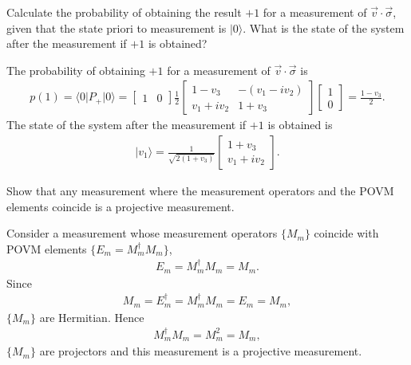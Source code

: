 \documentclass[en]{sol-man}
\begin{document}
\begin{exe}
    Calculate the probability of obtaining the result $+1$ for a measurement of $\vec{v}\cdot\vec{\sigma}$, given that the state priori to measurement is $\lvert 0\rangle$. What is the state of the system after the measurement if $+1$ is obtained?
\end{exe}
\begin{sol}
    The probability of obtaining $+1$ for a measurement of $\vec{v}\cdot\vec{\sigma}$ is
    \begin{align}
        p(1)=\langle 0\rvert P_+\lvert 0\rangle=\left[\begin{matrix}
            1&0
        \end{matrix}\right]\frac{1}{2}\left[\begin{matrix}
            1-v_3&-(v_1-iv_2)\\
            v_1+iv_2&1+v_3
        \end{matrix}\right]\left[\begin{matrix}
            1\\
            0
        \end{matrix}\right]=\frac{1-v_3}{2}.
    \end{align}
    The state of the system after the measurement if $+1$ is obtained is
    \begin{align}
        \lvert v_1\rangle=\frac{1}{\sqrt{2(1+v_3)}}\left[\begin{matrix}
            1+v_3\\
            v_1+iv_2
        \end{matrix}\right].
    \end{align}
\end{sol}

\begin{exe}
    Show that any measurement where the measurement operators and the POVM elements coincide is a projective measurement.
\end{exe}
\begin{pf}
    Consider a measurement whose measurement operators $\{M_m\}$ coincide with POVM elements $\{E_m=M_m^{\dagger}M_m\}$,
    \begin{align}
        E_m=M_m^{\dagger}M_m=M_m.
    \end{align}
    Since
    \begin{align}
        M_m=E_m^{\dagger}=M_m^{\dagger}M_m=E_m=M_m,
    \end{align}
    $\{M_m\}$ are Hermitian. Hence
    \begin{align}
        M_m^{\dagger}M_m=M_m^2=M_m,
    \end{align}
    $\{M_m\}$ are projectors and this measurement is a projective measurement.
\end{pf}
\end{document}
